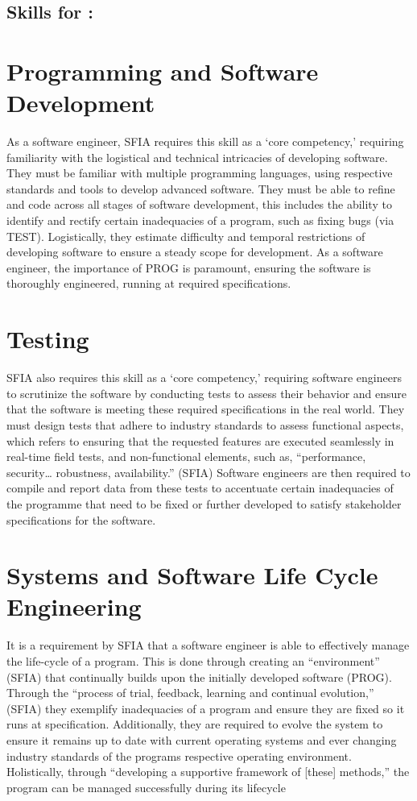 \documentclass[a4paper, 11pt]{report}
\begin{document}
\subsection{Skills for \majC: \studC}

\section*{Programming and Software Development}

As a software engineer, SFIA requires this skill as a ‘core competency,’ requiring familiarity with the logistical and technical intricacies of developing software. They must be familiar with multiple programming languages, using respective standards and tools to develop advanced software. They must be able to refine and code across all stages of software development, this includes the ability to identify and rectify certain inadequacies of a program, such as fixing bugs (via TEST). Logistically, they estimate difficulty and temporal restrictions of developing software to ensure a steady scope for development. As a software engineer, the importance of PROG is paramount, ensuring the software is thoroughly engineered, running at required specifications.

\section*{Testing}

SFIA also requires this skill as a ‘core competency,’ requiring software engineers to scrutinize the software by conducting tests to assess their behavior and ensure that the software is meeting these required specifications in the real world. They must design tests that adhere to industry standards to assess functional aspects, which refers to ensuring that the requested features are executed seamlessly in real-time field tests, and non-functional elements, such as, “performance, security… robustness, availability.” (SFIA) Software engineers are then required to compile and report data from these tests to accentuate certain inadequacies of the programme that need to be fixed or further developed to satisfy stakeholder specifications for the software.

\section*{Systems and Software Life Cycle Engineering} 

It is a requirement by SFIA that a software engineer is able to effectively manage the life-cycle of a program. This is done through creating an “environment” (SFIA) that continually builds upon the initially developed software (PROG). Through the “process of trial, feedback, learning and continual evolution,” (SFIA) they exemplify inadequacies of a program and ensure they are fixed so it runs at specification. Additionally, they are required to evolve the system to ensure it remains up to date with current operating systems and ever changing industry standards of the programs respective operating environment. Holistically, through “developing a supportive framework of [these] methods,” the program can be managed successfully during its lifecycle
\end{document}
